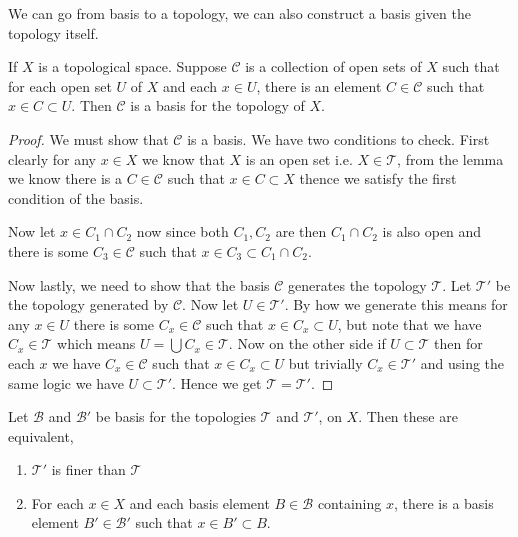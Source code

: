 \vspace{1em}
\qquad We can go from basis to a topology, we can also construct a basis given the topology itself.
\begin{lemma}
    If $X$ is a topological space. Suppose $\mathcal{C}$ is a collection of open sets of $X$ such that for each open set $U$ of $X$ and each $x \in U$, there is an element $C \in \mathcal{C}$ such that $x \in C \subset U$. Then $\mathcal{C}$ is a basis for the topology of $X$.
\end{lemma}
\begin{proof}
    We must show that $\mathcal{C}$ is a basis. We have two conditions to check. First clearly for any $x \in X$ we know that $X$ is an open set i.e. $X \in \mathcal{T}$, from the lemma we know there is a $C \in \mathcal{C}$ such that $x \in C \subset X$ thence we satisfy the first condition  of the basis.

    \vspace{1em}
    
    Now let $x \in C_{1} \cap C_{2}$ now since both $C_{1}, C_{2}$ are then $C_{1} \cap C_{2}$ is also open and there is some $C_{3} \in \mathcal{C}$ such that $x \in C_{3} \subset C_{1} \cap C_{2}$.

    \vspace{1em}
    
    Now lastly, we need to show that the basis $\mathcal{C}$ generates the topology $\mathcal{T}$. Let $\mathcal{T'}$ be the topology generated by $\mathcal{C}$. Now let $U \in \mathcal{T'}$. By how we generate this means for any $x \in U$ there is some $C_x \in \mathcal{C}$ such that $x \in C_x \subset U$, but note that we have $C_x \in \mathcal{T}$ which means $U = \bigcup C_x \in \mathcal{T}$. Now on the other side if $U \subset \mathcal{T}$ then for each $x$ we have $C_x \in \mathcal{C}$ such that $x \in C_x \subset U$ but trivially $C_x \in \mathcal{T'}$ and using the same logic we have $U \subset \mathcal{T'}$. Hence we get $\mathcal{T} = \mathcal{T'}$.
\end{proof}

\begin{lemma}
    Let $\mathcal{B}$ and $\mathcal{B'}$ be basis for the topologies $\mathcal{T}$ and $\mathcal{T'}$, on $X$. Then these are equivalent,

    \begin{enumerate}
        \item $\mathcal{T'}$ is finer than $\mathcal{T}$
        \item For each $x \in X$ and each basis element $B \in \mathcal{B}$ containing $x$, there is a basis element $B' \in \mathcal{B'}$ such that  $x \in B' \subset B$.
    \end{enumerate}
\end{lemma}

